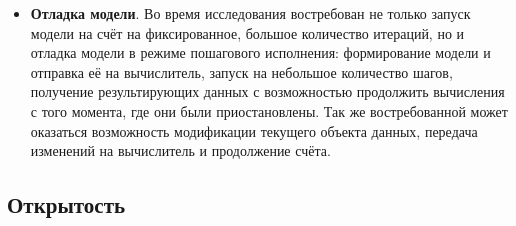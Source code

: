 \documentclass[a4paper,12pt]{extarticle}
\begin{document}
\begin{itemize}
    \item \textbf{Отладка модели}. 
        Во время исследования востребован не только запуск модели на счёт на фиксированное, большое количество итераций, но и отладка модели в режиме пошагового исполнения: формирование модели и отправка её на вычислитель, запуск на небольшое количество шагов, получение результирующих данных с возможностью продолжить вычисления с того момента, где они были приостановлены. Так же востребованной может оказаться возможность модификации текущего объекта данных, передача изменений на вычислитель и продолжение счёта.
\end{itemize}

\subsection{Открытость}
\label{sec:requirements-open}
\end{document}
